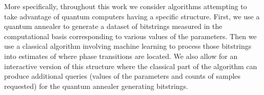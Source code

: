 \documentclass[american,aps,pra,reprint,floatfix,nofootinbib,superscriptaddress]{revtex4-2}
\begin{document}
More specifically, throughout this work we consider algorithms attempting
to take advantage of quantum computers having a specific structure. First,
we use a quantum annealer to generate a dataset of bitstrings measured
in the computational basis corresponding
to various values of the parameters. Then we use a classical algorithm
involving machine learning
to process those bitstrings into estimates of where phase transitions
are located. We also allow for an interactive version of this structure
where the classical part of the algorithm can produce additional queries
(values of the parameters and counts of samples requested) for the quantum
annealer generating bitstrings.
\begin{center}
  \pgfmathparse{\columnwidth/13.37cm}%
  \edef\tikzscale{\pgfmathresult}%
\end{center}
\end{document}
